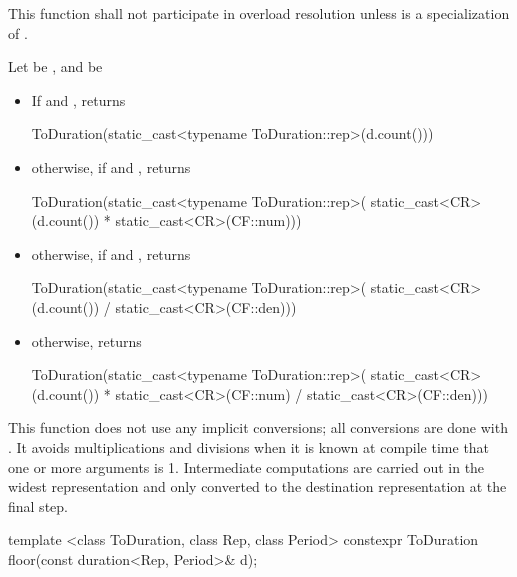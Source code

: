 \begin{itemdescr}
\pnum
\remarks This function shall not participate in overload resolution
unless  is a specialization of .

\pnum
\returns Let  be , and  be  
\begin{itemize}
\item If  and , returns
\begin{codeblock}
ToDuration(static_cast<typename ToDuration::rep>(d.count()))
\end{codeblock}

\item otherwise, if  and , returns
\begin{codeblock}
ToDuration(static_cast<typename ToDuration::rep>(
  static_cast<CR>(d.count()) * static_cast<CR>(CF::num)))
\end{codeblock}

\item otherwise, if  and , returns
\begin{codeblock}
ToDuration(static_cast<typename ToDuration::rep>(
  static_cast<CR>(d.count()) / static_cast<CR>(CF::den)))
\end{codeblock}

\item otherwise, returns
\begin{codeblock}
ToDuration(static_cast<typename ToDuration::rep>(
  static_cast<CR>(d.count()) * static_cast<CR>(CF::num) / static_cast<CR>(CF::den)))
\end{codeblock}
\end{itemize}

\realnotes This function does not use any implicit conversions; all conversions
are done with . It avoids multiplications and divisions when
it is known at compile time that one or more arguments is 1. Intermediate
computations are carried out in the widest representation and only converted to
the destination representation at the final step.
\end{itemdescr}

%
%
\begin{itemdecl}
template <class ToDuration, class Rep, class Period>
  constexpr ToDuration floor(const duration<Rep, Period>& d);
\end{itemdecl}

